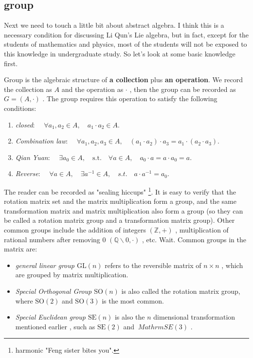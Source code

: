 \subsection{group}
Next we need to touch a little bit about abstract algebra.
I think this is a necessary condition for discussing Li Qun's Lie algebra, but in fact, except for the students of mathematics and physics, most of the students will not be exposed to this knowledge in undergraduate study.
So let's look at some basic knowledge first.

Group is the algebraic structure of \textbf{a collection} plus \textbf{an operation}.
We record the collection as $ A $ and the operation as $ \cdot $ , then the group can be recorded as $ G=(A, \cdot ) $ .
The group requires this operation to satisfy the following conditions:

\begin{enumerate}
\item { \emph{closed}}:          $ \quad \forall a_1, a_2 \in A, \quad a_1 \cdot a_2 \in A$.
\item { \emph{Combination law}}: $ \quad \forall a_1, a_2, a_3 \in A, \quad (a_1 \cdot a_2) \cdot a_3 = a_1 \cdot ( a_2 \cdot a_3) $.
\item { \emph{Qian Yuan}}:       $ \quad \exists a_0 \in A, \quad \mathrm{s.t.} \quad \forall a \in A, \quad a_0 \cdot a = a \cdot a_0 = a $.
\item { \emph{Reverse}}:         $ \quad \forall a \in A, \quad \exists a^{-1} \in A, \quad s.t. \quad a \cdot a^{-1} = a_0 $.
\end{enumerate}

The reader can be recorded as "sealing hiccups" \footnote{harmonic "Feng sister bites you".}.
It is easy to verify that the rotation matrix set and the matrix multiplication form a group, and the same transformation matrix and matrix multiplication also form a group (so they can be called a rotation matrix group and a transformation matrix group). Other common groups include the addition of integers $ ( \mathbb {Z}, +) $ , multiplication of rational numbers after removing 0 $ ( \mathbb {Q} \backslash  0 , \cdot ) $ , etc. Wait. Common groups in the matrix are:

\begin{itemize}
\item  \emph {general linear group $ \mathrm {GL}(n) $ } \quad refers to the reversible matrix of $ n \times n $ , which are grouped by matrix multiplication.

\item  \emph {Special Orthogonal Group $ \mathrm {SO}(n) $ } \quad is also called the rotation matrix group, where $ \mathrm {SO}( 2 ) $ and $ \mathrm {SO}( 3 ) $ is the most common.

\item  \emph {Special Euclidean group $ \mathrm {SE}(n) $ } \quad is also the $ n $ dimensional transformation mentioned earlier , such as $ \mathrm {SE}( 2 ) $ and $ \ Mathrm {SE}( 3 ) $ .
\end{itemize}

